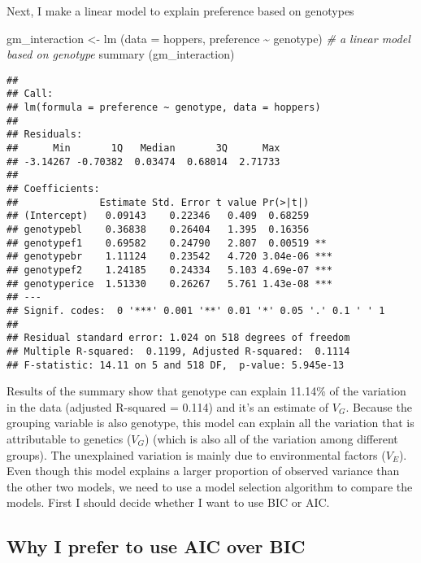 \documentclass[
]{article}
\newenvironment{Shaded}{\begin{snugshade}}{\end{snugshade}}
\newcommand{\AttributeTok}[1]{\textcolor[rgb]{0.77,0.63,0.00}{#1}}
\newcommand{\CommentTok}[1]{\textcolor[rgb]{0.56,0.35,0.01}{\textit{#1}}}
\newcommand{\FunctionTok}[1]{\textcolor[rgb]{0.00,0.00,0.00}{#1}}
\newcommand{\NormalTok}[1]{#1}
\newcommand{\OtherTok}[1]{\textcolor[rgb]{0.56,0.35,0.01}{#1}}
\newcommand{\SpecialCharTok}[1]{\textcolor[rgb]{0.00,0.00,0.00}{#1}}
\begin{document}
Next, I make a linear model to explain preference based on genotypes

\begin{Shaded}
\begin{Highlighting}[]
\NormalTok{gm\_interaction }\OtherTok{\textless{}{-}} \FunctionTok{lm}\NormalTok{ (}\AttributeTok{data =}\NormalTok{ hoppers, preference }\SpecialCharTok{\textasciitilde{}}\NormalTok{ genotype) }\CommentTok{\# a linear model based on genotype}
\FunctionTok{summary}\NormalTok{ (gm\_interaction)}
\end{Highlighting}
\end{Shaded}

\begin{verbatim}
## 
## Call:
## lm(formula = preference ~ genotype, data = hoppers)
## 
## Residuals:
##      Min       1Q   Median       3Q      Max 
## -3.14267 -0.70382  0.03474  0.68014  2.71733 
## 
## Coefficients:
##              Estimate Std. Error t value Pr(>|t|)    
## (Intercept)   0.09143    0.22346   0.409  0.68259    
## genotypebl    0.36838    0.26404   1.395  0.16356    
## genotypef1    0.69582    0.24790   2.807  0.00519 ** 
## genotypebr    1.11124    0.23542   4.720 3.04e-06 ***
## genotypef2    1.24185    0.24334   5.103 4.69e-07 ***
## genotyperice  1.51330    0.26267   5.761 1.43e-08 ***
## ---
## Signif. codes:  0 '***' 0.001 '**' 0.01 '*' 0.05 '.' 0.1 ' ' 1
## 
## Residual standard error: 1.024 on 518 degrees of freedom
## Multiple R-squared:  0.1199, Adjusted R-squared:  0.1114 
## F-statistic: 14.11 on 5 and 518 DF,  p-value: 5.945e-13
\end{verbatim}

Results of the summary show that genotype can explain 11.14\% of the
variation in the data (adjusted R-squared = 0.114) and it's an estimate
of \(V_G\). Because the grouping variable is also genotype, this model
can explain all the variation that is attributable to genetics (\(V_G\))
(which is also all of the variation among different groups). The
unexplained variation is mainly due to environmental factors (\(V_E\)).
Even though this model explains a larger proportion of observed variance
than the other two models, we need to use a model selection algorithm to
compare the models. First I should decide whether I want to use BIC or
AIC.

\hypertarget{why-i-prefer-to-use-aic-over-bic}{%
\subsection{Why I prefer to use AIC over
BIC}\label{why-i-prefer-to-use-aic-over-bic}}
\end{document}
